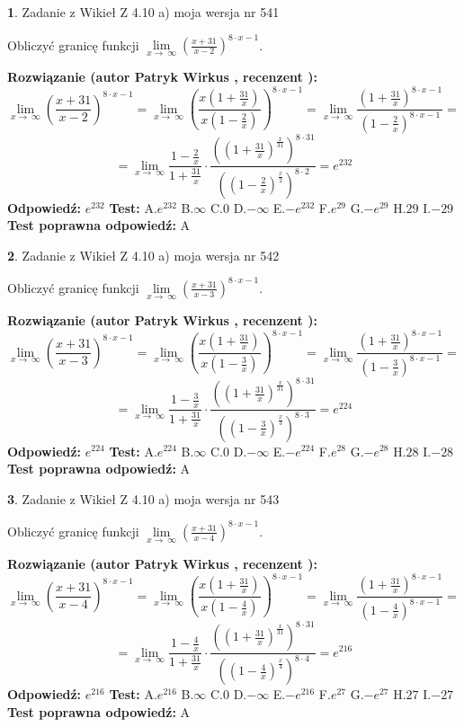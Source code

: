 \documentclass[12pt, a4paper]{article}
\theoremstyle{definition} %
\newtheorem{zad}{}
\newcommand{\zadStart}[1]{\begin{zad}#1\newline}
\newcommand{\zadStop}{\end{zad}}
\newcommand{\rozwStart}[2]{\noindent \textbf{Rozwiązanie (autor #1 , recenzent #2): }\newline}
\newcommand{\rozwStop}{\newline}
\newcommand{\odpStart}{\noindent \textbf{Odpowiedź:}\newline}
\newcommand{\odpStop}{\newline}
\newcommand{\testStart}{\noindent \textbf{Test:}\newline}
\newcommand{\testStop}{\newline}
\newcommand{\kluczStart}{\noindent \textbf{Test poprawna odpowiedź:}\newline}
\newcommand{\kluczStop}{\newline}
\begin{document}
\zadStart{Zadanie z Wikieł Z 4.10 a) moja wersja nr 541}

Obliczyć granicę funkcji  $\lim\limits_{x\to\ \infty}(\frac{x+31}{x-2})^{8\cdot x-1}$.
\zadStop
\rozwStart{Patryk Wirkus}{}
$$\lim\limits_{x\to\ \infty}(\frac{x+31}{x-2})^{8\cdot x-1} = \lim\limits_{x\to\ \infty}(\frac{x(1+\frac{31}{x})}{x(1-\frac{2}{x})})^{8\cdot x-1}=\lim\limits_{x\to\ \infty}\frac{(1+\frac{31}{x})^{8\cdot x-1}}{(1-\frac{2}{x})^{8\cdot x-1}}=$$
$$=\lim\limits_{x\to\ \infty}\frac{1-\frac{2}{x}}{1+\frac{31}{x}}\cdot\frac{((1+\frac{31}{x})^{\frac{x}{31}})^{8\cdot31}}{((1-\frac{2}{x})^{\frac{x}{2}})^{8\cdot2}}=e^{232}$$
\rozwStop
\odpStart
$e^{232}$
\odpStop
\testStart
A.$e^{232}$ B.$\infty$ C.$0$ D.$-\infty$ E.$-e^{232}$
F.$e^{29}$ G.$-e^{29}$
H.$29$
I.$-29$
\testStop
\kluczStart
A
\kluczStop



\zadStart{Zadanie z Wikieł Z 4.10 a) moja wersja nr 542}

Obliczyć granicę funkcji  $\lim\limits_{x\to\ \infty}(\frac{x+31}{x-3})^{8\cdot x-1}$.
\zadStop
\rozwStart{Patryk Wirkus}{}
$$\lim\limits_{x\to\ \infty}(\frac{x+31}{x-3})^{8\cdot x-1} = \lim\limits_{x\to\ \infty}(\frac{x(1+\frac{31}{x})}{x(1-\frac{3}{x})})^{8\cdot x-1}=\lim\limits_{x\to\ \infty}\frac{(1+\frac{31}{x})^{8\cdot x-1}}{(1-\frac{3}{x})^{8\cdot x-1}}=$$
$$=\lim\limits_{x\to\ \infty}\frac{1-\frac{3}{x}}{1+\frac{31}{x}}\cdot\frac{((1+\frac{31}{x})^{\frac{x}{31}})^{8\cdot31}}{((1-\frac{3}{x})^{\frac{x}{3}})^{8\cdot3}}=e^{224}$$
\rozwStop
\odpStart
$e^{224}$
\odpStop
\testStart
A.$e^{224}$ B.$\infty$ C.$0$ D.$-\infty$ E.$-e^{224}$
F.$e^{28}$ G.$-e^{28}$
H.$28$
I.$-28$
\testStop
\kluczStart
A
\kluczStop



\zadStart{Zadanie z Wikieł Z 4.10 a) moja wersja nr 543}

Obliczyć granicę funkcji  $\lim\limits_{x\to\ \infty}(\frac{x+31}{x-4})^{8\cdot x-1}$.
\zadStop
\rozwStart{Patryk Wirkus}{}
$$\lim\limits_{x\to\ \infty}(\frac{x+31}{x-4})^{8\cdot x-1} = \lim\limits_{x\to\ \infty}(\frac{x(1+\frac{31}{x})}{x(1-\frac{4}{x})})^{8\cdot x-1}=\lim\limits_{x\to\ \infty}\frac{(1+\frac{31}{x})^{8\cdot x-1}}{(1-\frac{4}{x})^{8\cdot x-1}}=$$
$$=\lim\limits_{x\to\ \infty}\frac{1-\frac{4}{x}}{1+\frac{31}{x}}\cdot\frac{((1+\frac{31}{x})^{\frac{x}{31}})^{8\cdot31}}{((1-\frac{4}{x})^{\frac{x}{4}})^{8\cdot4}}=e^{216}$$
\rozwStop
\odpStart
$e^{216}$
\odpStop
\testStart
A.$e^{216}$ B.$\infty$ C.$0$ D.$-\infty$ E.$-e^{216}$
F.$e^{27}$ G.$-e^{27}$
H.$27$
I.$-27$
\testStop
\kluczStart
A
\kluczStop
\end{document}
